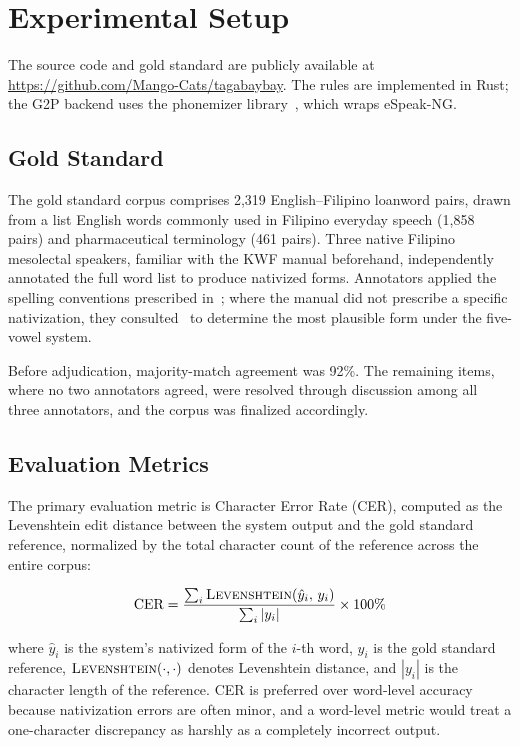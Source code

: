 \section{Experimental Setup}
The source code and gold standard are publicly available at
\url{https://github.com/Mango-Cats/tagabaybay}. The rules are implemented in
Rust; the G2P backend uses the phonemizer library~\cite{bernard2021}, which
wraps eSpeak-NG.

\subsection{Gold Standard}

The gold standard corpus comprises 2,319 English--Filipino loanword pairs,
drawn from a list English words commonly used in Filipino everyday speech
(1,858 pairs) and pharmaceutical terminology (461 pairs). Three native Filipino
mesolectal speakers, familiar with the KWF manual beforehand, independently
annotated the full word list to produce nativized forms. Annotators applied the
spelling conventions prescribed in~\cite{almario2014,schachter1972}; where the
manual did not prescribe a specific nativization, they
consulted~\cite{llamzon1966,llamzon1997} to determine the most plausible form
under the five-vowel system.

Before adjudication, majority-match agreement was 92\%. The remaining items,
where no two annotators agreed, were resolved through discussion among all
three annotators, and the corpus was finalized accordingly.

\subsection{Evaluation Metrics}\label{ssec:evaluation_metrics}

The primary evaluation metric is Character Error Rate (CER), computed as the
Levenshtein edit distance between the system output and the gold standard
reference, normalized by the total character count of the reference across the
entire corpus:

\begin{equation*}
    \text{CER} = \frac{\sum_{i} \textsc{Levenshtein}(\hat{y}_i,\, y_i)}
    {\sum_{i} |y_i|}
    \times 100\%
\end{equation*}

where \(\hat{y}_i\) is the system's nativized form of the \(i\)-th word,
\(y_i\) is the gold standard reference, \(\textsc{Levenshtein}(\cdot,\cdot)\)
denotes Levenshtein distance, and \(|y_i|\) is the character length of the
reference. CER is preferred over word-level accuracy because nativization
errors are often minor, and a word-level metric would treat a one-character
discrepancy as harshly as a completely incorrect output.

